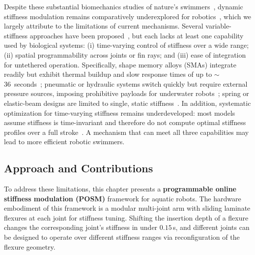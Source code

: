 Despite these substantial biomechanics studies of nature's swimmers~\cite{behbahani_design_2016,jia_energy-efficient_2015,hu_design_2024,lu_development_2022,john_h_long_importance_1996}, dynamic stiffness modulation remains comparatively underexplored for robotics~\cite{obayashi_online_2025}, which we largely attribute to the limitations of current mechanisms. Several variable-stiffness approaches have been proposed~\cite{obayashi_online_2025,zhong_tunable_2021,liao_fast_2024,wang_design_2025,wolf_fish-like_2020,sharifzadeh_curvature-induced_2021,kwak_development_2023,Bobing_Octopus_2025}, but each lacks at least one capability used by biological systems: (i) time-varying control of stiffness over a wide range; (ii) spatial programmability across joints or fin rays; and (iii) ease of integration for untethered operation. Specifically, shape memory alloys (SMAs) integrate readily but exhibit thermal buildup and slow response times of up to $\sim$36~seconds~\cite{liu_tunable_2023}; pneumatic or hydraulic systems switch quickly but require external pressure sources, imposing prohibitive payloads for underwater robots~\cite{jusufi_undulatory_2017,obayashi_online_2025,HVS_2023}; spring or elastic-beam designs are limited to single, static stiffness~\cite{zhong_tunable_2021,liao_fast_2024,wang_design_2025,sharifzadeh_curvature-induced_2021}. In addition, systematic optimization for time-varying stiffness remains underdeveloped: most models assume stiffness is time-invariant and therefore do not compute optimal stiffness profiles over a full stroke~\cite{Bobing_Octopus_2025}. A mechanism that can meet all three capabilities may lead to more efficient robotic swimmers.

\subsection{Approach and Contributions}

To address these limitations, this chapter presents a \textbf{programmable online stiffness modulation (POSM)} framework for aquatic robots. The hardware embodiment of this framework is a modular multi-joint arm with sliding laminate flexures at each joint for stiffness tuning. Shifting the insertion depth of a flexure changes the corresponding joint's stiffness in under $0.15$\,s, and different joints can be designed to operate over different stiffness ranges via reconfiguration of the flexure geometry.

